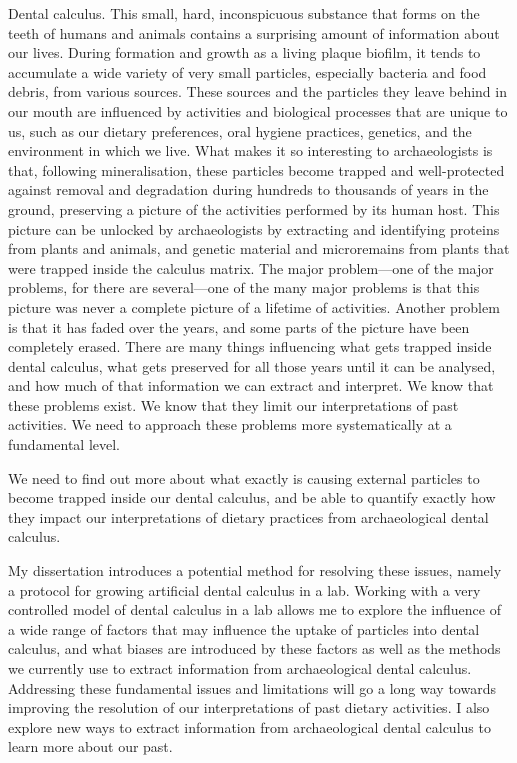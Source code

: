 \documentclass[
  b5paper,
]{book}
\begin{document}
Dental calculus. This small, hard, inconspicuous substance that forms on
the teeth of humans and animals contains a surprising amount of
information about our lives. During formation and growth as a living
plaque biofilm, it tends to accumulate a wide variety of very small
particles, especially bacteria and food debris, from various sources.
These sources and the particles they leave behind in our mouth are
influenced by activities and biological processes that are unique to us,
such as our dietary preferences, oral hygiene practices, genetics, and
the environment in which we live. What makes it so interesting to
archaeologists is that, following mineralisation, these particles become
trapped and well-protected against removal and degradation during
hundreds to thousands of years in the ground, preserving a picture of
the activities performed by its human host. This picture can be unlocked
by archaeologists by extracting and identifying proteins from plants and
animals, and genetic material and microremains from plants that were
trapped inside the calculus matrix. The major problem---one of the major
problems, for there are several---one of the many major problems is that
this picture was never a complete picture of a lifetime of activities.
Another problem is that it has faded over the years, and some parts of
the picture have been completely erased. There are many things
influencing what gets trapped inside dental calculus, what gets
preserved for all those years until it can be analysed, and how much of
that information we can extract and interpret. We know that these
problems exist. We know that they limit our interpretations of past
activities. We need to approach these problems more systematically at a
fundamental level.

We need to find out more about what exactly is causing external
particles to become trapped inside our dental calculus, and be able to
quantify exactly how they impact our interpretations of dietary
practices from archaeological dental calculus.

My dissertation introduces a potential method for resolving these
issues, namely a protocol for growing artificial dental calculus in a
lab. Working with a very controlled model of dental calculus in a lab
allows me to explore the influence of a wide range of factors that may
influence the uptake of particles into dental calculus, and what biases
are introduced by these factors as well as the methods we currently use
to extract information from archaeological dental calculus. Addressing
these fundamental issues and limitations will go a long way towards
improving the resolution of our interpretations of past dietary
activities. I also explore new ways to extract information from
archaeological dental calculus to learn more about our past.
\end{document}

